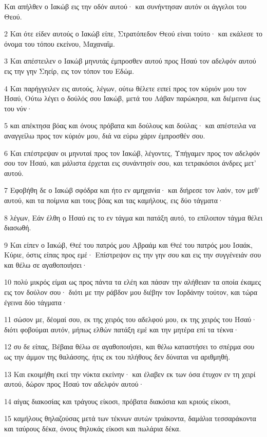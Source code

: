 \par Και απήλθεν ο Ιακώβ εις την οδόν αυτού· και συνήντησαν αυτόν οι άγγελοι του Θεού.
\par 2 Και ότε είδεν αυτούς ο Ιακώβ είπε, Στρατόπεδον Θεού είναι τούτο· και εκάλεσε το όνομα του τόπου εκείνου, Μαχαναΐμ.
\par 3 Και απέστειλεν ο Ιακώβ μηνυτάς έμπροσθεν αυτού προς Ησαύ τον αδελφόν αυτού εις την γην Σηείρ, εις τον τόπον του Εδώμ.
\par 4 Και παρήγγειλεν εις αυτούς, λέγων, ούτω θέλετε ειπεί προς τον κύριόν μου τον Ησαύ, Ούτω λέγει ο δούλός σου Ιακώβ, μετά του Λάβαν παρώκησα, και διέμεινα έως του νύν·
\par 5 και απέκτησα βόας και όνους πρόβατα και δούλους και δούλας· και απέστειλα να αναγγείλω προς τον κύριόν μου, διά να εύρω χάριν έμπροσθέν σου.
\par 6 Και επέστρεψαν οι μηνυταί προς τον Ιακώβ, λέγοντες, Υπήγαμεν προς τον αδελφόν σου τον Ησαύ, και μάλιστα έρχεται εις συνάντησίν σου, και τετρακόσιοι άνδρες μετ' αυτού.
\par 7 Εφοβήθη δε ο Ιακώβ σφόδρα και ήτο εν αμηχανία· και διήρεσε τον λαόν, τον μεθ' αυτού, και τα ποίμνια και τους βόας και τας καμήλους, εις δύο τάγματα·
\par 8 λέγων, Εάν έλθη ο Ησαύ εις το εν τάγμα και πατάξη αυτό, το επίλοιπον τάγμα θέλει διασωθή.
\par 9 Και είπεν ο Ιακώβ, Θεέ του πατρός μου Αβραάμ και Θεέ του πατρός μου Ισαάκ, Κύριε, όστις είπας προς εμέ· Επίστρεψον εις την γην σου και εις την συγγένειάν σου και θέλω σε αγαθοποιήσει·
\par 10 πολύ μικρός είμαι ως προς πάντα τα ελέη και πάσαν την αλήθειαν τα οποία έκαμες εις τον δούλον σου· διότι με την ράβδον μου διέβην τον Ιορδάνην τούτον, και τώρα έγεινα δύο τάγματα·
\par 11 σώσον με, δέομαί σου, εκ της χειρός του αδελφού μου, εκ της χειρός του Ησαύ· διότι φοβούμαι αυτόν, μήπως ελθών πατάξη εμέ και την μητέρα επί τα τέκνα·
\par 12 συ δε είπας, Βέβαια θέλω σε αγαθοποιήσει, και θέλω καταστήσει το σπέρμα σου ως την άμμον της θαλάσσης, ήτις εκ του πλήθους δεν δύναται να αριθμηθή.
\par 13 Και εκοιμήθη εκεί την νύκτα εκείνην· και έλαβεν εκ των όσα έτυχον εν τη χειρί αυτού, δώρον προς Ησαύ τον αδελφόν αυτού·
\par 14 αίγας διακοσίας και τράγους είκοσι, πρόβατα διακόσια και κριούς είκοσι,
\par 15 καμήλους θηλαζούσας μετά των τέκνων αυτών τριάκοντα, δαμάλια τεσσαράκοντα και ταύρους δέκα, όνους θηλυκάς είκοσι και πωλάρια δέκα.
